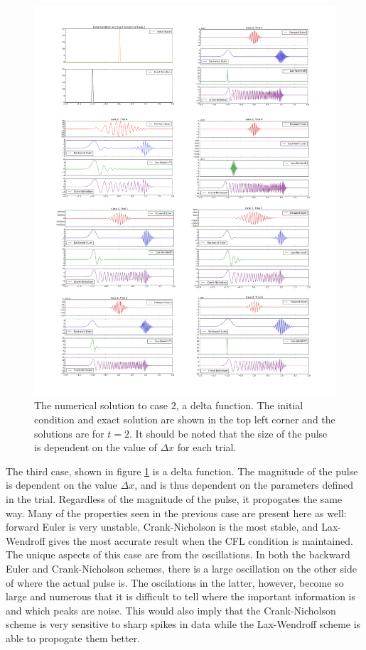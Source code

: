 \documentclass[twocolumn]{article}
\begin{document}
\begin{figure}[ph]
	\includegraphics[width=\textwidth, trim=0 0 0 4.5cm]{case2}
	\caption{
		The numerical solution to case $2$, a delta function. The initial
		condition and exact solution are shown in the top left corner and
		the solutions are for $t=2$. It should be noted that the size of
		the pulse is dependent on the value of $\Delta x$ for each trial.
	}
	\label{fig:case2}
\end{figure}

The third case, shown in figure \ref{fig:case2} is a delta
function. The magnitude of the pulse is dependent on the value $\Delta
x$, and is thus dependent on the parameters defined in the
trial. Regardless of the magnitude of the pulse, it propogates the
same way. Many of the properties seen in the previous case are present
here as well: forward Euler is very unstable, Crank-Nicholson is the
most stable, and Lax-Wendroff gives the most accurate result when the
CFL condition is maintained. The unique aspects of this case are from
the oscillations. In both the backward Euler and Crank-Nicholson
schemes, there is a large oscillation on the other side of where the
actual pulse is. The oscilations in the latter, however, become so
large and numerous that it is difficult to tell where the important
information is and which peaks are noise. This would also imply that
the Crank-Nicholson scheme is very sensitive to sharp spikes in data
while the Lax-Wendroff scheme is able to propogate them better.
\end{document}
